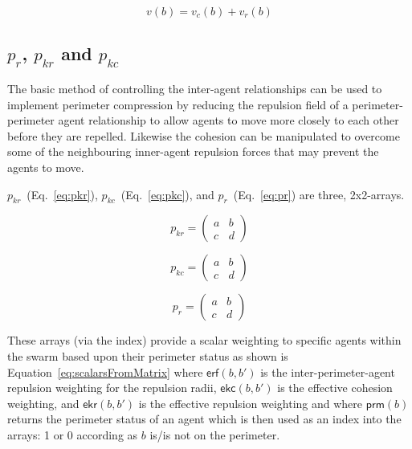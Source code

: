 \documentclass[12pt,a4paper]{IEEEtran}
\begin{document}
\begin{equation}\label{eq:newModel2}
v(b) = v_c(b) + v_r(b)
\end{equation}

\subsection{$p_r$, $p_{kr}$ and $p_{kc}$}

The basic method of controlling the inter-agent relationships can be used to implement perimeter compression by reducing the repulsion field of a perimeter-perimeter agent relationship to allow agents to move more closely to each other before they are repelled. Likewise the cohesion can be manipulated to overcome some of the neighbouring inner-agent repulsion forces that may prevent the agents to move.

$p_{kr}$~(Eq.~\ref{eq:pkr}), $p_{kc}$~(Eq.~\ref{eq:pkc}), and $p_r$~(Eq.~\ref{eq:pr}) are three, 2x2-arrays.

\begin{equation}\label{eq:pkr}
	p_{kr} = \left (
	\begin{array}{cc}
	a & b\\
	c & d
	\end{array} \right )
\end{equation}
	
\begin{equation}\label{eq:pkc}
	p_{kc} = \left (
	\begin{array}{cc}
	a & b\\
	c & d
	\end{array} \right )
\end{equation}

\begin{equation}\label{eq:pr}
	p_{r} = \left (
	\begin{array}{cc}
	a & b\\
	c & d
	\end{array} \right )
\end{equation}

These arrays (via the index) provide a scalar weighting to specific agents within the swarm based upon their perimeter status as shown is Equation~\ref{eq:scalarsFromMatrix} where $\mathsf{erf}(b, b')$ is the inter-perimeter-agent repulsion weighting for the repulsion radii, $\mathsf{ekc}(b, b')$ is the effective cohesion weighting, and $\mathsf{ekr}(b, b')$ is the effective repulsion weighting and where $\mathsf{prm}(b)$ returns the perimeter status of an agent which is then used as an index into the arrays: 1 or 0 according as $b$ is/is not on the perimeter.
\end{document}
